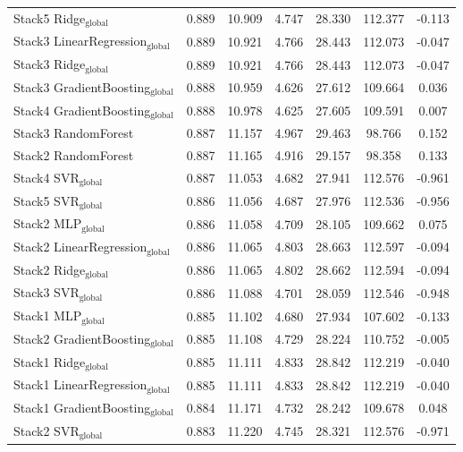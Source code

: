 \documentclass[a4paper,twocolumn]{article}
\begin{document}
\begin{table}
{\begin{tabular}{p{4.5cm}cccccc}
        Stack5 Ridge$_{\text{global}}$ & 0.889 & 10.909 & 4.747 & 28.330 & 112.377 & -0.113 \\
        Stack3 LinearRegression$_{\text{global}}$ & 0.889 & 10.921 & 4.766 & 28.443 & 112.073 & -0.047 \\
        Stack3 Ridge$_{\text{global}}$ & 0.889 & 10.921 & 4.766 & 28.443 & 112.073 & -0.047 \\
        Stack3 GradientBoosting$_{\text{global}}$ & 0.888 & 10.959 & 4.626 & 27.612 & 109.664 & 0.036 \\
        Stack4 GradientBoosting$_{\text{global}}$ & 0.888 & 10.978 & 4.625 & 27.605 & 109.591 & 0.007 \\
        Stack3 RandomForest & 0.887 & 11.157 & 4.967 & 29.463 & 98.766 & 0.152 \\
        Stack2 RandomForest & 0.887 & 11.165 & 4.916 & 29.157 & 98.358 & 0.133 \\
        Stack4 SVR$_{\text{global}}$ & 0.887 & 11.053 & 4.682 & 27.941 & 112.576 & -0.961 \\
        Stack5 SVR$_{\text{global}}$ & 0.886 & 11.056 & 4.687 & 27.976 & 112.536 & -0.956 \\
        Stack2 MLP$_{\text{global}}$ & 0.886 & 11.058 & 4.709 & 28.105 & 109.662 & 0.075 \\
        Stack2 LinearRegression$_{\text{global}}$ & 0.886 & 11.065 & 4.803 & 28.663 & 112.597 & -0.094 \\
        Stack2 Ridge$_{\text{global}}$ & 0.886 & 11.065 & 4.802 & 28.662 & 112.594 & -0.094 \\
        Stack3 SVR$_{\text{global}}$ & 0.886 & 11.088 & 4.701 & 28.059 & 112.546 & -0.948 \\
        Stack1 MLP$_{\text{global}}$ & 0.885 & 11.102 & 4.680 & 27.934 & 107.602 & -0.133 \\
        Stack2 GradientBoosting$_{\text{global}}$ & 0.885 & 11.108 & 4.729 & 28.224 & 110.752 & -0.005 \\
        Stack1 Ridge$_{\text{global}}$ & 0.885 & 11.111 & 4.833 & 28.842 & 112.219 & -0.040 \\
        Stack1 LinearRegression$_{\text{global}}$ & 0.885 & 11.111 & 4.833 & 28.842 & 112.219 & -0.040 \\
        Stack1 GradientBoosting$_{\text{global}}$ & 0.884 & 11.171 & 4.732 & 28.242 & 109.678 & 0.048 \\
        Stack2 SVR$_{\text{global}}$ & 0.883 & 11.220 & 4.745 & 28.321 & 112.576 & -0.971 \\

\end{tabular}}
\end{table}
\end{document}
